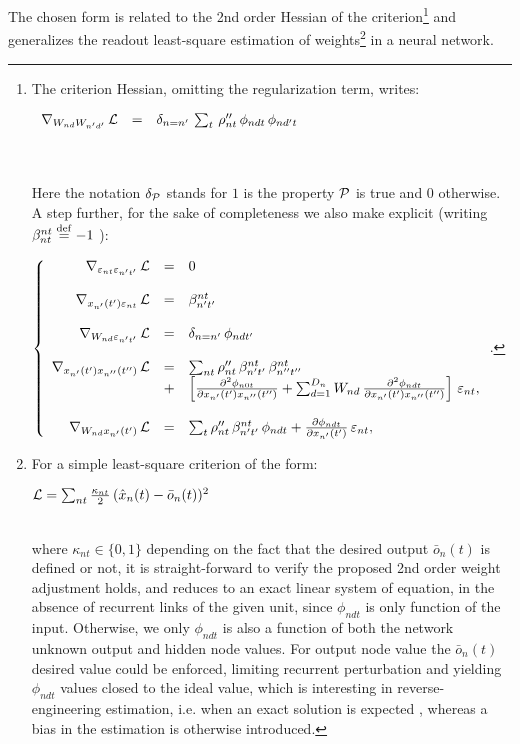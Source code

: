 The chosen form is related to the 2nd order Hessian of the criterion\footnote{
\label{criterion-hessian} The criterion Hessian, omitting the regularization term, writes: \\ \centerline{$\left.\begin{array}{rcl}
\nabla_{W_{nd} W_{n'd'}} \, {\cal L} &=& \delta_{n=n'} \, \sum_t \, \rho''_{nt} \, \phi_{ndt} \, \phi_{nd't} 
\end{array}\right.$}\\
\\ Here the notation $\delta_{\cal P}$ stands for $1$ is the property ${\cal P}$ is true and $0$ otherwise.
\\ A step further, for the sake of completeness we also make explicit (writing $\beta_{nt}^{nt} \stackrel {\rm def}{=} -1$ ):
\\ \centerline{$\left\{\begin{array}{rcl}
\nabla_{\varepsilon_{nt} \varepsilon_{n't'}} \, {\cal L} &=& 0 \\
&&\\
\nabla_{x_{n'}(t') \varepsilon_{nt}} \, {\cal L} &=& \beta_{n't'}^{nt} \\
&&\\
\nabla_{W_{nd} \varepsilon_{n't'}} \, {\cal L} &=& \delta_{n=n'} \, \phi_{ndt'} \\
&&\\
\nabla_{x_{n'}(t') x_{n''}(t'')} \, {\cal L} &=&  \sum_{nt} \rho''_{nt} \, \beta_{n't'}^{nt} \, \beta_{n''t''}^{nt}
 \\&+& \left[ \frac{\partial^2 \phi_{n0t}}{\partial x_{n'}(t') x_{n''}(t'')} + \sum_{d = 1}^{D_{n}} W_{nd} \, \frac{\partial^2 \phi_{ndt}}{\partial x_{n'}(t') x_{n''}(t'')} \right] \, \varepsilon_{nt}, \\
&&\\
\nabla_{W_{nd} x_{n'}(t')} \, {\cal L} &=&  \sum_{t} \rho''_{nt} \, \beta_{n't'}^{nt} \, \phi_{ndt}
 + \frac{\partial \phi_{ndt}}{\partial x_{n'}(t')} \, \varepsilon_{nt}, \\
\end{array}\right.$.}} and generalizes the readout least-square estimation of weights\footnote{
For a simple least-square criterion of the form:
\\ \centerline{${\cal L} = \sum_{nt} \frac{\kappa_{nt}}{2} \, (\hat{x}_n(t) - \bar{o}_n(t))^2$} \\
where $\kappa_{nt} \in \{0, 1\}$ depending on the fact that the desired output $\bar{o}_n(t)$ is defined or not, it is straight-forward to verify the proposed 2nd order weight adjustment holds, and reduces to an exact linear system of equation, in the absence of recurrent links of the given unit, since $\phi_{ndt}$ is only function of the input. Otherwise, we only $\phi_{ndt}$ is also a function of both the network unknown output and hidden node values. For output node value the $\bar{o}_n(t)$ desired value could be enforced, limiting recurrent perturbation and yielding $\phi_{ndt}$ values closed to the ideal value, which is interesting in reverse-engineering estimation, i.e. when an exact solution is expected \cite{rostro-gonzalez-cessac-etal:10}, whereas a bias in the estimation is otherwise introduced.} in a neural network.


